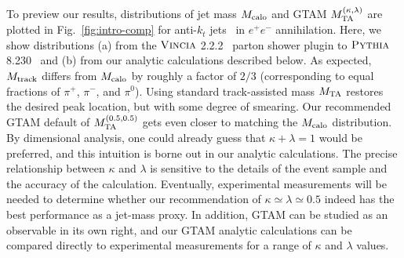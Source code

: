 \documentclass[letterpaper,11pt]{article}
\newcommand{\Fig}[1]{Fig.~\ref{#1}}
\begin{document}
To preview our results, distributions of jet mass $M_{\rm calo}$ and GTAM $M_{\rm TA}^{(\kappa,\lambda)}$ are plotted in \Fig{fig:intro-comp} for anti-$k_t$ jets~\cite{Cacciari:2008gp} in $e^+e^-$ annihilation.
%
Here, we show distributions (a) from the $\textsc{Vincia}$ 2.2.2~\cite{Giele:2007di,Fischer:2016vfv} parton shower plugin to $\textsc{Pythia}$ 8.230~\cite{Sjostrand:2006za,Sjostrand:2014zea} and (b) from our analytic calculations described below. 
%
As expected, $M_{\rm track}$ differs from $M_{\rm calo}$ by roughly a factor of $2/3$ (corresponding to equal fractions of $\pi^+$, $\pi^-$, and $\pi^0$).
%
Using standard track-assisted mass $M_{\rm TA}$ restores the desired peak location, but with some degree of smearing.
%
Our recommended GTAM default of $M_{\rm TA}^{(0.5,0.5)}$ gets even closer to matching the $M_{\rm calo}$ distribution.
%
By dimensional analysis, one could already guess that $\kappa + \lambda = 1$ would be preferred, and this intuition is borne out in our analytic calculations.
%
The precise relationship between $\kappa$ and $\lambda$ is sensitive to the details of the event sample and the accuracy of the calculation.
%
Eventually, experimental measurements will be needed to determine whether our recommendation of $\kappa \simeq \lambda\simeq 0.5$ indeed has the best performance as a jet-mass proxy.
%
In addition, GTAM can be studied as an observable in its own right, and our GTAM analytic calculations can be compared directly to experimental measurements for a range of $\kappa$ and $\lambda$ values.

\end{document}
